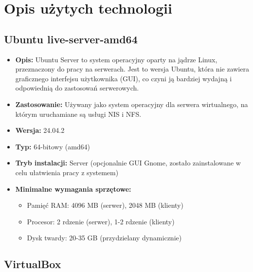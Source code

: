 \newpage
\section{Opis użytych technologii}		%

\subsection{Ubuntu live-server-amd64}

\begin{itemize}
    \item \textbf{Opis:} Ubuntu Server\cite{Ubuntu} to system operacyjny oparty na jądrze Linux, przeznaczony do pracy na serwerach. Jest to wersja Ubuntu, która nie zawiera graficznego interfejsu użytkownika (GUI), co czyni ją bardziej wydajną i odpowiednią do zastosowań serwerowych.
    \item \textbf{Zastosowanie:} Używany jako system operacyjny dla serwera wirtualnego, na którym uruchamiane są usługi NIS i NFS\cite{linuxquestions}\cite{securenetes:Redhat}\cite{www1}\cite{www2}.
    \item \textbf{Wersja:} 24.04.2
    \item \textbf{Typ:} 64-bitowy (amd64)
    \item \textbf{Tryb instalacji:} Server (opcjonalnie GUI Gnome, zostało zainstalowane w celu ułatwienia pracy z systemem)
    \item \textbf{Minimalne wymagania sprzętowe:}
    \begin{itemize}
        \item Pamięć RAM: 4096 MB (serwer), 2048 MB (klienty)
        \item Procesor: 2 rdzenie (serwer), 1-2 rdzenie (klienty)
        \item Dysk twardy: 20-35 GB (przydzielany dynamicznie)
    \end{itemize}
\end{itemize}
\subsection{VirtualBox}

